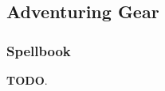 \subsection*{Adventuring Gear} \label{ssec::adventuringgear}

\subsubsection{Spellbook} \label{item::spellbook}
    \textbf{TODO}.
